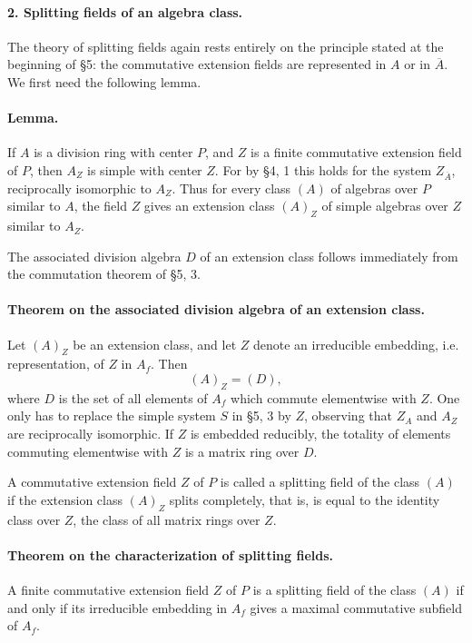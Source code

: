 \documentclass[11pt]{article}
\begin{document}
\paragraph{2. Splitting fields of an algebra class.}
The theory of splitting fields again rests entirely on the principle stated at the beginning of §5: the commutative extension fields are represented in \(A\) or in \(\overline A\). We first need the following lemma.

\paragraph{Lemma.}
If \(A\) is a division ring with center \(P\), and \(Z\) is a finite commutative extension field of \(P\), then \(A_Z\) is simple with center \(Z\). For by §4, 1 this holds for the system \(Z_{\overline A}\), reciprocally isomorphic to \(A_Z\). Thus for every class \((A)\) of algebras over \(P\) similar to \(A\), the field \(Z\) gives an extension class \((A)_Z\) of simple algebras over \(Z\) similar to \(A_Z\).

The associated division algebra \(D\) of an extension class follows immediately from the commutation theorem of §5, 3.

\paragraph{Theorem on the associated division algebra of an extension class.}
Let \((A)_Z\) be an extension class, and let \(Z\) denote an irreducible embedding, i.e. representation, of \(Z\) in \(A_f\). Then
\[
        (A)_Z=(D),
\]
where \(D\) is the set of all elements of \(A_f\) which commute elementwise with \(Z\). One only has to replace the simple system \(S\) in §5, 3 by \(Z\), observing that \(Z_A\) and \(A_Z\) are reciprocally isomorphic. If \(Z\) is embedded reducibly, the totality of elements commuting elementwise with \(Z\) is a matrix ring over \(D\).

A commutative extension field \(Z\) of \(P\) is called a splitting field of the class \((A)\) if the extension class \((A)_Z\) splits completely, that is, is equal to the identity class over \(Z\), the class of all matrix rings over \(Z\).

\paragraph{Theorem on the characterization of splitting fields.}
A finite commutative extension field \(Z\) of \(P\) is a splitting field of the class \((A)\) if and only if its irreducible embedding in \(A_f\) gives a maximal commutative subfield of \(A_f\).
\end{document}
